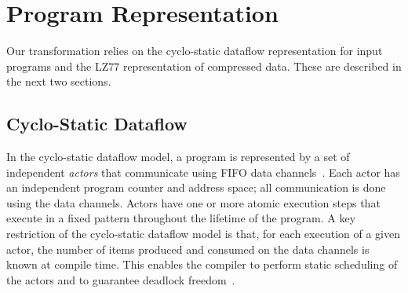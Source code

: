 \newcommand{\x}{\hspace{1.3pt}} %
\newcommand{\concat}[0]{\bullet}               %
\newcommand{\name}[1]{~~\hfill\framebox{#1}}   %

\newcommand{\skiptop}[0]{\vspace{-13pt}\\}   %
\newcommand{\skiptopa}[0]{\vspace{-1pt}\\}   %
\newcommand{\skiptopb}[0]{\vspace{-3pt}\\}   %
\newcommand{\skipbot}[0]{\vspace{-3pt}\\}    %

\newcommand{\tup}[2]{\langle#1, #2\rangle}

\newcommand{\pos}[0]{\mbox{\it pos}}

\newcommand{\tab}[0]{\mbox{~~~~}}


\enlargethispage{0.5pt}
\section{Program Representation}

Our transformation relies on the cyclo-static dataflow representation
for input programs and the LZ77 representation of compressed data.
These are described in the next two sections.

\subsection{Cyclo-Static Dataflow}

In the cyclo-static dataflow model, a program is represented by a set
of independent {\it actors} that communicate using FIFO data
channels~\cite{bilsen95-cyclostatic,LM87-i}.  Each actor has an
independent program counter and address space; all communication is
done using the data channels.  Actors have one or more atomic
execution steps that execute in a fixed pattern throughout the
lifetime of the program.  A key restriction of the cyclo-static
dataflow model is that, for each execution of a given actor, the
number of items produced and consumed on the data channels is known at
compile time.  This enables the compiler to perform static scheduling
of the actors and to guarantee deadlock freedom~\cite{bilsen95-cyclostatic,LM87-i}.

